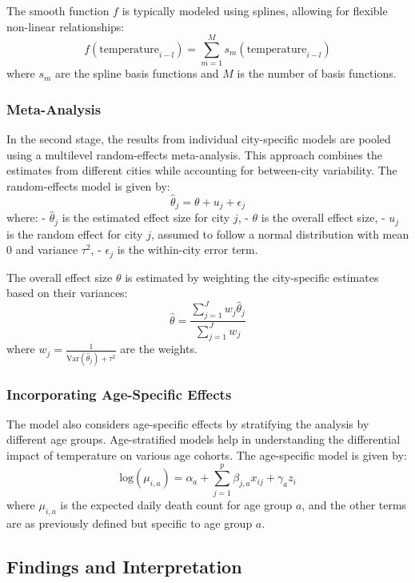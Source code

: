 \documentclass[
]{krantz}
\begin{document}
The smooth function \(f\) is typically modeled using splines, allowing for flexible non-linear relationships:
\[ f(\text{temperature}_{i-l}) = \sum_{m=1}^{M} s_m(\text{temperature}_{i-l}) \]
where \(s_m\) are the spline basis functions and \(M\) is the number of basis functions.

\subsubsection{Meta-Analysis}\label{meta-analysis}

In the second stage, the results from individual city-specific models are pooled using a multilevel random-effects meta-analysis. This approach combines the estimates from different cities while accounting for between-city variability. The random-effects model is given by:
\[ \hat{\theta}_j = \theta + u_j + \epsilon_j \]
where:
- \(\hat{\theta}_j\) is the estimated effect size for city \(j\),
- \(\theta\) is the overall effect size,
- \(u_j\) is the random effect for city \(j\), assumed to follow a normal distribution with mean 0 and variance \(\tau^2\),
- \(\epsilon_j\) is the within-city error term.

The overall effect size \(\theta\) is estimated by weighting the city-specific estimates based on their variances:
\[ \hat{\theta} = \frac{\sum_{j=1}^{J} w_j \hat{\theta}_j}{\sum_{j=1}^{J} w_j} \]
where \(w_j = \frac{1}{\text{Var}(\hat{\theta}_j) + \tau^2}\) are the weights.

\subsubsection{Incorporating Age-Specific Effects}\label{incorporating-age-specific-effects}

The model also considers age-specific effects by stratifying the analysis by different age groups. Age-stratified models help in understanding the differential impact of temperature on various age cohorts. The age-specific model is given by:
\[ \text{log}(\mu_{i,a}) = \alpha_a + \sum_{j=1}^{p} \beta_{j,a} x_{ij} + \gamma_a z_i \]
where \(\mu_{i,a}\) is the expected daily death count for age group \(a\), and the other terms are as previously defined but specific to age group \(a\).

\subsection{Findings and Interpretation}\label{findings-and-interpretation}
\end{document}

